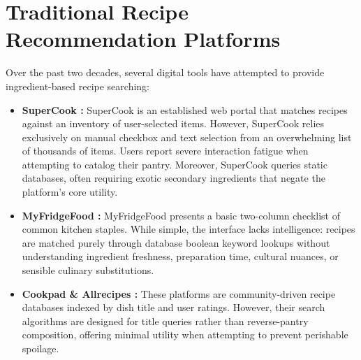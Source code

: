 \section{Traditional Recipe Recommendation Platforms}
Over the past two decades, several digital tools have attempted to provide ingredient-based recipe searching:
\begin{itemize}
    \item \textbf{SuperCook \cite{supercook2023}:} SuperCook is an established web portal that matches recipes against an inventory of user-selected items. However, SuperCook relies exclusively on manual checkbox and text selection from an overwhelming list of thousands of items. Users report severe interaction fatigue when attempting to catalog their pantry. Moreover, SuperCook queries static databases, often requiring exotic secondary ingredients that negate the platform's core utility.
    \item \textbf{MyFridgeFood \cite{myfridgefood2022}:} MyFridgeFood presents a basic two-column checklist of common kitchen staples. While simple, the interface lacks intelligence: recipes are matched purely through database boolean keyword lookups without understanding ingredient freshness, preparation time, cultural nuances, or sensible culinary substitutions.
    \item \textbf{Cookpad \& Allrecipes \cite{allrecipes2023}:} These platforms are community-driven recipe databases indexed by dish title and user ratings. However, their search algorithms are designed for title queries rather than reverse-pantry composition, offering minimal utility when attempting to prevent perishable spoilage.
\end{itemize}


